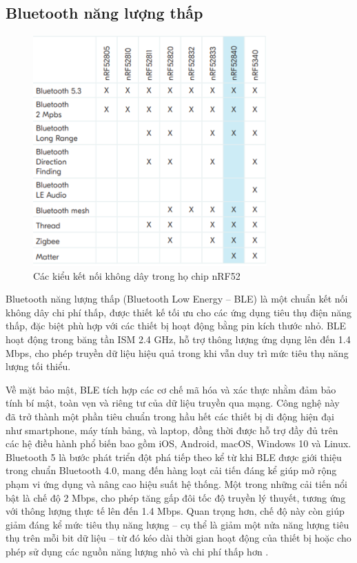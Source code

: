 \subsection{Bluetooth năng lượng thấp}
    
\begin{figure}[!ht]
		\centering
 		\includegraphics[width=0.8\textwidth]{images/ble.png}
		\caption{Các kiểu kết nối không dây trong họ chip nRF52}
		\label{ble}
\end{figure}

Bluetooth năng lượng thấp (Bluetooth Low Energy – BLE) là một chuẩn kết nối không dây chi phí thấp, được thiết kế tối ưu cho các ứng dụng tiêu thụ điện năng thấp, đặc biệt phù hợp với các thiết bị hoạt động bằng pin kích thước nhỏ. BLE hoạt động trong băng tần ISM 2.4 GHz, hỗ trợ thông lượng ứng dụng lên đến 1.4 Mbps, cho phép truyền dữ liệu hiệu quả trong khi vẫn duy trì mức tiêu thụ năng lượng tối thiểu.

Về mặt bảo mật, BLE tích hợp các cơ chế mã hóa và xác thực nhằm đảm bảo tính bí mật, toàn vẹn và riêng tư của dữ liệu truyền qua mạng. Công nghệ này đã trở thành một phần tiêu chuẩn trong hầu hết các thiết bị di động hiện đại như smartphone, máy tính bảng, và laptop, đồng thời được hỗ trợ đầy đủ trên các hệ điều hành phổ biến bao gồm iOS, Android, macOS, Windows 10 và Linux. Bluetooth 5 là bước phát triển đột phá tiếp theo kể từ khi BLE được giới thiệu trong chuẩn Bluetooth 4.0, mang đến hàng loạt cải tiến đáng kể giúp mở rộng phạm vi ứng dụng và nâng cao hiệu suất hệ thống. Một trong những cải tiến nổi bật là chế độ 2 Mbps, cho phép tăng gấp đôi tốc độ truyền lý thuyết, tương ứng với thông lượng thực tế lên đến 1.4 Mbps. Quan trọng hơn, chế độ này còn giúp giảm đáng kể mức tiêu thụ năng lượng – cụ thể là giảm một nửa năng lượng tiêu thụ trên mỗi bit dữ liệu – từ đó kéo dài thời gian hoạt động của thiết bị hoặc cho phép sử dụng các nguồn năng lượng nhỏ và chi phí thấp hơn \cite{BLE}. 


